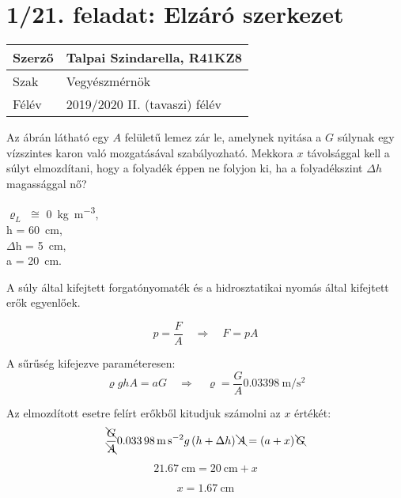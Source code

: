 \section*{1/21. feladat: Elzáró szerkezet}
\begin{tabular}{ | p{2cm} | p{14cm} | } 
	\hline
	Szerző & Talpai Szindarella, R41KZ8 \\ 
	\hline
	Szak & Vegyészmérnök \\ 
	\hline
	Félév & 2019/2020 II. (tavaszi) félév \\ 
	\hline
\end{tabular}
\vspace{0.5cm}

\noindent  Az ábrán látható egy $ A $ felületű lemez zár le, amelynek nyitása a $ G $ súlynak egy vízszintes karon való mozgatásával szabályozható. Mekkora $ x $ távolsággal kell a súlyt elmozdítani, hogy a folyadék éppen ne folyjon ki, ha a folyadékszint $\Delta h$ magassággal nő?

\begin{flushleft}
	$\varrho_{L}$ $\cong$ \SI{0}{\kilogram\per\meter\cubed},\\
	h = \SI{60}{\centi\meter},\\
	$\Delta$h = \SI{5}{\centi\meter},\\
	a = \SI{20}{\centi\meter}.
\end{flushleft}

\noindent\hrulefill

\noindent A  súly által kifejtett forgatónyomaték és a hidrosztatikai nyomás által kifejtett erők egyenlőek.

\begin{equation}
	p = \dfrac{F}{A}
	\quad 
	\Rightarrow
	\quad 
	F = pA
\end{equation}

\noindent A sűrűség kifejezve paraméteresen:
\begin{equation}
	 \varrho ghA = aG
	 \quad 
	 \Rightarrow
	 \quad 
	 \varrho = \dfrac{G}{A} \SI{0,03398}{\meter\per\second\squared}
\end{equation}

\noindent Az elmozdított esetre felírt erőkből kitudjuk számolni az $x$ értékét:
\begin{equation}
	\dfrac{\bcancel{G}}{\bcancel{A}}
	 \SI{0,03398}{\meter\per\second\squared} g \left( h + \Delta h\right) \bcancel{A}
	 = 
	 \left( a+x\right) \bcancel{G}
\end{equation}

\begin{equation}
	\SI{21,67}{\centi\meter} = \SI{20}{\centi\meter} + x 
\end{equation}

\begin{equation}
	x = \SI{1,67}{\centi\meter}
\end{equation}

